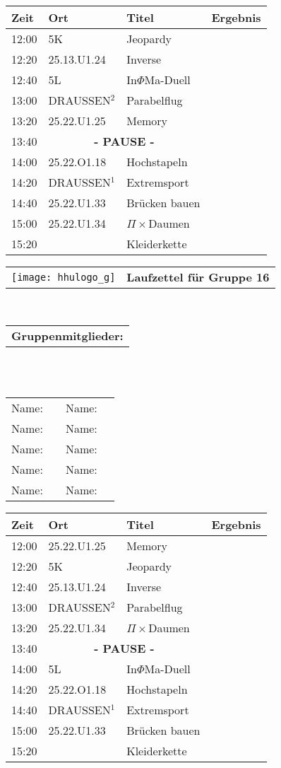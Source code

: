 \documentclass[a4paper,10pt]{article}
\def\spiela{25.22.U1.33 & Brücken bauen}
\def\spielb{DRAUSSEN$^1$ \footnotetext[1]{zwischen 25.22.U1 und 25.13.U1} & Extremsport}
\def\spielc{25.22.O1.18 & Hochstapeln}
\def\spield{5L & In$\Phi $Ma-Duell}
\def\spielee{ 25.13.U1.24 & Inverse}
\def\spielf{5K & Jeopardy}
\def\spielgg{25.22.U1.25 & Memory}
\def\spielh{DRAUSSEN$^2$ \footnotetext[2]{zwischen 25.22.U1 und 25.33.U1} & Parabelflug}
\def\spieli{ 25.22.U1.34 & $\Pi \times $Daumen}
\def\spielj{ & Kleiderkette}
\def\pause{\multicolumn{2}{|c|}{\textbf{- PAUSE -}}}
\newcommand{\oben}[1]{

\begin{tabularx}{\textwidth}{lc}
  \texttt{[image: hhulogo\_g]}
& {\Huge \textbf{Laufzettel für Gruppe #1}}
\end{tabularx}
\large
\vspace{0.5cm} \\
\begin{tabularx}{\textwidth}{l}\textbf{Gruppenmitglieder:} \end{tabularx}\\ \phantom{blub}\\
\begin{tabularx}{\textwidth}{p{0.1\textwidth}p{0.4\textwidth}p{0.1\textwidth}p{0.4\textwidth}}
Name: & \underline{\hspace{6cm}} & Name: & \underline{\hspace{6cm}}\\
Name: & \underline{\hspace{6cm}} & Name: & \underline{\hspace{6cm}}\\
Name: & \underline{\hspace{6cm}} & Name: & \underline{\hspace{6cm}}\\
Name: & \underline{\hspace{6cm}} & Name: & \underline{\hspace{6cm}}\\
Name: & \underline{\hspace{6cm}} & Name: & \underline{\hspace{6cm}}\\
\end{tabularx}



}
\begin{document}
  \LARGE
  \begin{center}
  \vspace{1cm}
  \begin{tabularx}{\textwidth}{p{2.5cm}||p{4.5cm}|p{6.5cm}|l}

  \textbf{Zeit}  & \textbf{Ort} 	&\textbf{Titel} 		& \textbf{Ergebnis} 	\\ \hline \hline

  12:00 &\spielf			&		\\ \hline
  12:20 &\spielee			&		\\ \hline
  12:40 &\spield			&		\\ \hline

  13:00 &\spielh		 	&		\\ \hline
  13:20 &\spielgg			&		\\ \hline
  13:40 &\pause			&		\\ \hline

  14:00 &\spielc			&		\\ \hline
  14:20 &\spielb			&		\\ \hline
  14:40 &\spiela			&		\\ \hline 

  15:00 &\spieli			&		\\ \hline \hline
  15:20 &\spielj			&

  \end{tabularx}
  \end{center}

  \newpage


  \oben{16}

  \LARGE
  \begin{center}
  \vspace{1cm}
  \begin{tabularx}{\textwidth}{p{2.5cm}||p{4.5cm}|p{6.5cm}|l}

  \textbf{Zeit}  & \textbf{Ort} 	&\textbf{Titel} 		& \textbf{Ergebnis} 	\\ \hline \hline

  12:00 &\spielgg			&		\\ \hline
  12:20 &\spielf			&		\\ \hline
  12:40 &\spielee			&		\\ \hline

  13:00 &\spielh		 	&		\\ \hline
  13:20 &\spieli			&		\\ \hline
  13:40 &\pause			&		\\ \hline

  14:00 &\spield			&		\\ \hline
  14:20 &\spielc			&		\\ \hline
  14:40 &\spielb			&		\\ \hline 

  15:00 &\spiela			&		\\ \hline \hline
  15:20 &\spielj			&

  \end{tabularx}
  \end{center}
\end{document}
